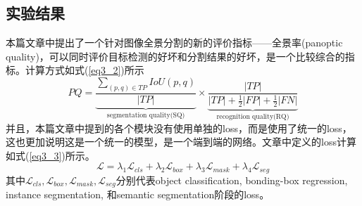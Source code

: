 \documentclass[cn]{elegantbook}
\begin{document}
\subsection{实验结果}
本篇文章中提出了一个针对图像全景分割的新的评价指标——全景率(panoptic quality)，可以同时评价目标检测的好坏和分割结果的好坏，是一个比较综合的指标。计算方式如式(\ref{eq3_2})所示
\begin{equation}
\label{eq3_2}
PQ=\underbrace{\frac{\sum_{(p,q)\in TP}IoU(p,q)}{|TP|}}_{\mbox{segmentation quality(SQ)}}\times\underbrace{\frac{|TP|}{|TP|+\frac{1}{2}|FP|+\frac{1}{2}|FN|}}_{\mbox{recognition quality(RQ)}}
\end{equation}
并且，本篇文章中提到的各个模块没有使用单独的loss，而是使用了统一的loss，这也更加说明这是一个统一的模型，是一个端到端的网络。文章中定义的loss计算如式(\ref{eq3_3})所示。
\begin{equation}
\label{eq3_3}
\mathcal{L}=\lambda_1\mathcal{L}_{cls}+\lambda_2\mathcal{L}_{box}+\lambda_3\mathcal{L}_{mask}+\lambda_4\mathcal{L}_{seg}
\end{equation}
其中$\mathcal{L}_{cls},\mathcal{L}_{box},\mathcal{L}_{mask},\mathcal{L}_{seg}$分别代表object classification, bonding-box regression, instance segmentation, 和semantic segmentation阶段的loss。
\end{document}
